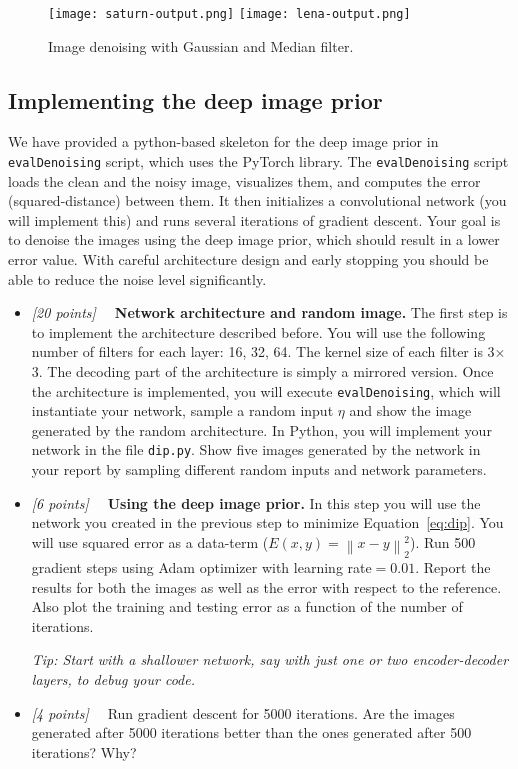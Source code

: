 \documentclass[10pt,letterpaper]{article}
\newcommand{\cmd}[1] {{\color{blue}\texttt{#1}}}
\newcommand{\norm}[1]{\left\lVert#1\right\rVert} %
\newcommand{\points}[1]{{\color{mygreen}\emph{[#1]\ \ }}}
\begin{document}
\begin{figure}[h]
\centering
\texttt{[image: saturn-output.png]}
\texttt{[image: lena-output.png]}
\caption{\label{fig:bayer} Image denoising with Gaussian and Median filter.}
\end{figure}


\subsection{Implementing the deep image prior}

We have provided a python-based skeleton for the deep image prior in \cmd{evalDenoising} script, which uses the PyTorch library. 
The \cmd{evalDenoising} script loads the clean and the noisy image, visualizes them, and computes the error (squared-distance) between them.
It then initializes a convolutional network (you will implement this) and runs several iterations of gradient descent.
Your goal is to denoise the images using the deep image prior, which
should result in a lower error value. With careful architecture design
and early stopping you should be able to reduce the noise level
significantly.

\begin{itemize}
\item \points{20 points} \textbf{Network architecture and random
  image.} The first step is to implement the architecture described
  before. You will use the following number of filters for each layer:
  16, 32, 64. The kernel size of each filter is 3$\times$3.	
The decoding part of the architecture is simply a mirrored
version. Once the architecture is implemented, you will execute
\cmd{evalDenoising}, which will instantiate your network, sample a
random input $\eta$ and show the image generated by the random
architecture. In Python, you will implement your network in the file
\cmd{dip.py}. Show five images generated by the network in your report
by sampling different random inputs and network parameters.

\item \points{6 points} \textbf{Using the deep image prior.}
  In this step you will use the network you created in the
  previous step to minimize Equation~\ref{eq:dip}. You will
  use squared error as a data-term ($E(x,y) =
  \norm{x-y}_2^2$). Run 500 gradient steps using Adam
  optimizer with learning rate$=0.01$. Report the results for
  both the images as well as the error with respect to the
  reference. Also plot the training and testing error as a
  function of the number of iterations.

  \emph{Tip: Start with a shallower network, say with just one or two
    encoder-decoder layers, to debug your code.}
\item \points{4 points} Run gradient descent for 5000 iterations. Are
  the images generated after 5000 iterations better than the ones
  generated after 500 iterations? Why?

\end{itemize}
\end{document}
